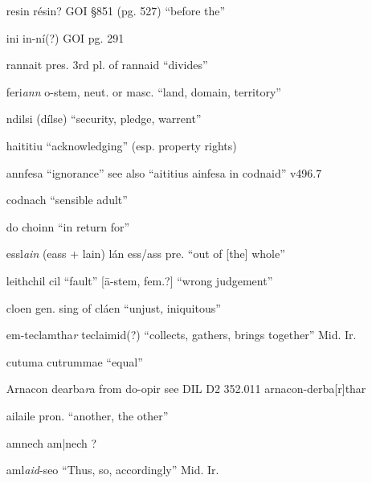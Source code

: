 \documentclass[11pt]{article}
\begin{document}
\begin{enumerate}
  \item[resin] r\'{e}sin? GOI \S 851 (pg. 527) \enquote{before the}

  \item[ini] in-n\'{i}(?) GOI pg. 291

  \item[rannait] pres. 3rd pl. of rannaid \enquote{divides}

  \item[feri\emph{ann}] o-stem, neut. or masc. \enquote{land, domain, territory}

  \item[ndilsi] (d\'{i}lse) \enquote{security, pledge, warrent}

  \item[haititiu] \enquote{acknowledging} (esp. property rights)

  \item[annfesa] \enquote{ignorance} see also \enquote{aititius ainfesa in codnaid} v496.7

  \item[codnach] \enquote{sensible adult}

  \item[do choinn] \enquote{in return for}

  \item[essl\emph{ain}] (eass + lain) l\'{a}n ess/ass pre. \enquote{out of [the] whole}

  \item[leithchil] cil \enquote{fault} [\={a}-stem, fem.?] \enquote{wrong judgement}
  
  \item[cloen] gen. sing of cl\'{a}en \enquote{unjust, iniquitous}

  \item[em-teclamtha\emph{r}] teclaimid(?) \enquote{collects, gathers, brings together} Mid. Ir.

  \item[cutuma] cutrummae \enquote{equal}

  \item[Arnacon dearba\emph{r}a] from do-opir see DIL D2 352.011 arnacon-derba[r]thar

  \item[ailaile] pron. \enquote{another, the other}

  \item[amnech] am|nech ?

  \item[aml\emph{aid}-seo] \enquote{Thus, so, accordingly} Mid. Ir.


\end{enumerate}
\end{document}
